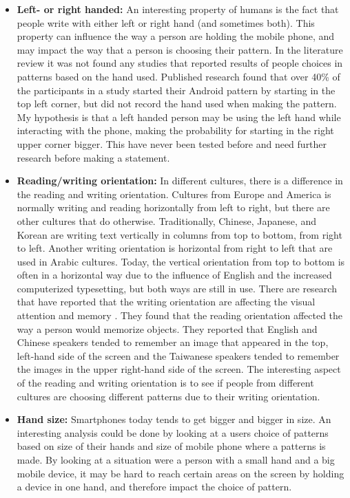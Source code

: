 \begin{itemize}
      \item {\bf Left- or right handed:} An interesting property of humans is the fact that people write with either left or right hand (and sometimes both). This property can influence the way a person are holding the mobile phone, and may impact the way that a person is choosing their pattern. In the literature review it was not found any studies that reported results of people choices in patterns based on the hand used. Published research \cite{Uellenbeck} found that over 40\% of the participants in a study started their Android pattern by starting in the top left corner, but did not record the hand used when making the pattern. My hypothesis is that a left handed person may be using the left hand while interacting with the phone, making the probability for starting in the right upper corner bigger. This have never been tested before and need further research before making a statement. 
      \item {\bf Reading/writing orientation:} In different cultures, there is a difference in the reading and writing orientation. Cultures from Europe and America is normally writing and reading horizontally from left to right, but there are other cultures that do otherwise. Traditionally, Chinese, Japanese, and Korean are writing text vertically in columns from top to bottom, from right to left. Another writing orientation is horizontal from right to left that are used in Arabic cultures. Today, the vertical orientation from top to bottom is often in a horizontal way due to the influence of English and the increased computerized typesetting, but both ways are still in use. There are research that have reported that the writing orientation are affecting the visual attention and memory \cite{Chan}. They found that the reading orientation affected the way a person would memorize objects. They reported that English and Chinese speakers tended to remember an image that appeared in the top, left-hand side of the screen and the Taiwanese speakers tended to remember the images in the upper right-hand side of the screen. The interesting aspect of the reading and writing orientation is to see if people from different cultures are choosing different patterns due to their writing orientation.
      \item {\bf Hand size:} Smartphones today tends to get bigger and bigger in size. An interesting analysis could be done by looking at a users choice of patterns based on size of their hands and size of mobile phone where a patterns is made. By looking at a situation were a person with a small hand and a big mobile device, it may be hard to reach certain areas on the screen by holding a device in one hand, and therefore impact the choice of pattern. 
    \end{itemize}

